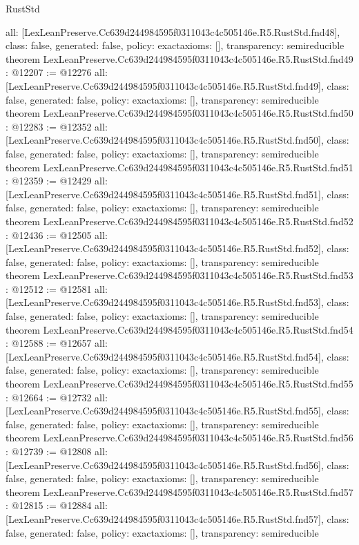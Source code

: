 \begin{lexlean}{RustStd}
\begin{coremodule}
{  all: [LexLeanPreserve.Cc639d244984595f0311043c4c505146e.R5.RustStd.fnd48],
  class: false,
  generated: false,
  policy: exact{axioms: []},
  transparency: semireducible
}
theorem LexLeanPreserve.Cc639d244984595f0311043c4c505146e.R5.RustStd.fnd49 : @12207 := @12276 {
  all: [LexLeanPreserve.Cc639d244984595f0311043c4c505146e.R5.RustStd.fnd49],
  class: false,
  generated: false,
  policy: exact{axioms: []},
  transparency: semireducible
}
theorem LexLeanPreserve.Cc639d244984595f0311043c4c505146e.R5.RustStd.fnd50 : @12283 := @12352 {
  all: [LexLeanPreserve.Cc639d244984595f0311043c4c505146e.R5.RustStd.fnd50],
  class: false,
  generated: false,
  policy: exact{axioms: []},
  transparency: semireducible
}
theorem LexLeanPreserve.Cc639d244984595f0311043c4c505146e.R5.RustStd.fnd51 : @12359 := @12429 {
  all: [LexLeanPreserve.Cc639d244984595f0311043c4c505146e.R5.RustStd.fnd51],
  class: false,
  generated: false,
  policy: exact{axioms: []},
  transparency: semireducible
}
theorem LexLeanPreserve.Cc639d244984595f0311043c4c505146e.R5.RustStd.fnd52 : @12436 := @12505 {
  all: [LexLeanPreserve.Cc639d244984595f0311043c4c505146e.R5.RustStd.fnd52],
  class: false,
  generated: false,
  policy: exact{axioms: []},
  transparency: semireducible
}
theorem LexLeanPreserve.Cc639d244984595f0311043c4c505146e.R5.RustStd.fnd53 : @12512 := @12581 {
  all: [LexLeanPreserve.Cc639d244984595f0311043c4c505146e.R5.RustStd.fnd53],
  class: false,
  generated: false,
  policy: exact{axioms: []},
  transparency: semireducible
}
theorem LexLeanPreserve.Cc639d244984595f0311043c4c505146e.R5.RustStd.fnd54 : @12588 := @12657 {
  all: [LexLeanPreserve.Cc639d244984595f0311043c4c505146e.R5.RustStd.fnd54],
  class: false,
  generated: false,
  policy: exact{axioms: []},
  transparency: semireducible
}
theorem LexLeanPreserve.Cc639d244984595f0311043c4c505146e.R5.RustStd.fnd55 : @12664 := @12732 {
  all: [LexLeanPreserve.Cc639d244984595f0311043c4c505146e.R5.RustStd.fnd55],
  class: false,
  generated: false,
  policy: exact{axioms: []},
  transparency: semireducible
}
theorem LexLeanPreserve.Cc639d244984595f0311043c4c505146e.R5.RustStd.fnd56 : @12739 := @12808 {
  all: [LexLeanPreserve.Cc639d244984595f0311043c4c505146e.R5.RustStd.fnd56],
  class: false,
  generated: false,
  policy: exact{axioms: []},
  transparency: semireducible
}
theorem LexLeanPreserve.Cc639d244984595f0311043c4c505146e.R5.RustStd.fnd57 : @12815 := @12884 {
  all: [LexLeanPreserve.Cc639d244984595f0311043c4c505146e.R5.RustStd.fnd57],
  class: false,
  generated: false,
  policy: exact{axioms: []},
  transparency: semireducible
}
\end{coremodule}
\end{lexlean}
